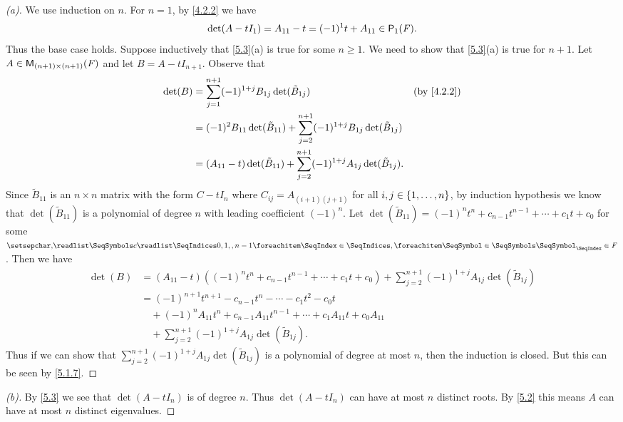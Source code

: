 \begin{proof}[(a)]
	We use induction on \(n\).
	For \(n = 1\), by \cref{4.2.2} we have
	\[
		\det(A - t I_1) = A_{1 1} - t = (-1)^1 t + A_{1 1} \in \ps[1]{\F}.
	\]
	Thus the base case holds.
	Suppose inductively that \cref{5.3}(a) is true for some \(n \geq 1\).
	We need to show that \cref{5.3}(a) is true for \(n + 1\).
	Let \(A \in \mathsf{M}_{{(n + 1)} \times (n + 1)}({\mathit{F}})\) and let \(B = A - t I_{n + 1}\).
	Observe that
	\begin{align*}
		\det(B) & = \sum_{j = 1}^{n + 1} (-1)^{1 + j} B_{1 j} \det(\tilde{B}_{1 j})                                          &  & \by{4.2.2} \\
		        & = (-1)^{2} B_{1 1} \det(\tilde{B}_{1 1}) + \sum_{j = 2}^{n + 1} (-1)^{1 + j} B_{1 j} \det(\tilde{B}_{1 j})                 \\
		        & = (A_{1 1} - t) \det(\tilde{B}_{1 1}) + \sum_{j = 2}^{n + 1} (-1)^{1 + j} A_{1 j} \det(\tilde{B}_{1 j}).
	\end{align*}
	Since \(\tilde{B}_{1 1}\) is an \(n \times n\) matrix with the form \(C - t I_n\) where \(C_{i j} = A_{(i + 1) (j + 1)}\) for all \(i, j \in \left\lbrace1, \dots, n\right\rbrace\), by induction hypothesis we know that \(\det(\tilde{B}_{1 1})\) is a polynomial of degree \(n\) with leading coefficient \((-1)^n\).
	Let \(\det(\tilde{B}_{1 1}) = (-1)^n t^n + c_{n - 1} t^{n - 1} + \cdots + c_1 t + c_0\) for some \(\seq{c}{0,1,,n-1} \in \F\).
	Then we have
	\begin{align*}
		\det(B) & = (A_{1 1} - t) ((-1)^{n} t^n + c_{n - 1} t^{n - 1} + \cdots + c_1 t + c_0) + \sum_{j = 2}^{n + 1} (-1)^{1 + j} A_{1 j} \det(\tilde{B}_{1 j}) \\
		        & = (-1)^{n + 1} t^{n + 1} - c_{n - 1} t^n - \cdots - c_1 t^2 - c_0 t                                                                           \\
		        & \quad + (-1)^n A_{1 1} t^n + c_{n - 1} A_{1 1} t^{n - 1} + \cdots + c_1 A_{1 1} t + c_0 A_{1 1}                                               \\
		        & \quad + \sum_{j = 2}^{n + 1} (-1)^{1 + j} A_{1 j} \det(\tilde{B}_{1 j}).
	\end{align*}
	Thus if we can show that \(\sum_{j = 2}^{n + 1} (-1)^{1 + j} A_{1 j} \det(\tilde{B}_{1 j})\) is a polynomial of degree at most \(n\), then the induction is closed.
	But this can be seen by \cref{5.1.7}.
\end{proof}

\begin{proof}[(b)]
	By \cref{5.3} we see that \(\det(A - t I_n)\) is of degree \(n\).
	Thus \(\det(A - t I_n)\) can have at most \(n\) distinct roots.
	By \cref{5.2} this means \(A\) can have at most \(n\) distinct eigenvalues.
\end{proof}

